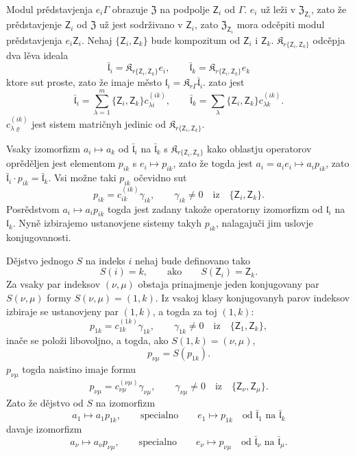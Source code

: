 \documentclass[11pt]{article}
\begin{document}
Modul prědstavjenja \(e_i\Gamma\) obrazuje \(\mathfrak Z\) na podpolje \(\mathsf{Z}_i\) od \(\Gamma\). \(e_i\) už leži v \(\mathfrak Z_{\mathsf{Z}_i}\), zato že prědstavjenje \(\mathsf{Z}_i\) od \(\mathfrak Z\) už jest sodrživano v \(\mathsf{Z}_i\), zato \(\mathfrak Z_{\mathsf{Z}_i}\) mora odcěpiti modul prědstavjenja \(e_i\mathsf{Z}_i\). Nehaj \(\{\mathsf{Z}_i,\mathsf{Z}_k\}\) bude kompozitum od \(\mathsf{Z}_i\) i \(\mathsf{Z}_k\). \(\mathfrak K_{r\{\mathsf{Z}_i,\mathsf{Z}_k\}}\) odcěpja dva lěva ideala
\[
\bar{\mathfrak l}_i=\mathfrak K_{r\{\mathsf{Z}_i,\mathsf{Z}_k\}}e_i,\qquad
\bar{\mathfrak l}_k=\mathfrak K_{r\{\mathsf{Z}_i,\mathsf{Z}_k\}}e_k
\]
ktore sut proste, zato že imaje město \(\mathfrak l_i=\mathfrak K_{r\Gamma}\bar{\mathfrak l}_i\). zato jest
\[
\bar{\mathfrak l}_i=\sum_{\lambda=1}^m\{\mathsf{Z}_i,\mathsf{Z}_k\}c_{\lambda i}^{(ik)},\qquad
\bar{\mathfrak l}_k=\sum_{\lambda}\{\mathsf{Z}_i,\mathsf{Z}_k\}c_{\lambda k}^{(ik)}.
\]
\(c_{\lambda\varrho}^{(ik)}\) jest sistem matričnyh jedinic od \(\mathfrak K_{r\{\mathsf{Z}_i,\mathsf{Z}_k\}}\).

Vsaky izomorfizm \(a_i\mapsto a_k\) od \(\bar{\mathfrak l}_i\) na \(\bar{\mathfrak l}_k\) s \(\mathfrak K_{r\{\mathsf{Z}_i,\mathsf{Z}_k\}}\) kako oblastju operatorov oprěděljen jest elementom \(p_{ik}\) s \(e_i\mapsto p_{ik}\), zato že togda jest \(a_i=a_ie_i\mapsto a_ip_{ik}\), zato \(\bar{\mathfrak l}_i\cdot p_{ik}=\bar{\mathfrak l}_k\). Vsi možne taki \(p_{ik}\) očevidno sut
\[
p_{ik}=c_{ik}^{(ik)}\gamma_{ik},\qquad \gamma_{ik}\ne0\quad\text{iz}\quad \{\mathsf{Z}_i,\mathsf{Z}_k\}.
\]
Posrědstvom \(a_i\mapsto a_ip_{ik}\) togda jest zadany takože operatorny izomorfizm od \(\mathfrak l_i\) na \(\mathfrak l_k\). Nyně izbirajemo ustanovjene sistemy takyh \(p_{ik}\), nalagajuči jim uslovje konjugovanosti.

Dějstvo jednogo \(S\) na indeks \(i\) nehaj bude definovano tako
\[
S(i)=k,\qquad\text{ako}\qquad S(\mathsf{Z}_i)=\mathsf{Z}_k.
\]
Za vsaky par indeksov \((\nu,\mu)\) obstaja prinajmenje jeden konjugovany par \(S(\nu,\mu)\) formy \(S(\nu,\mu)=(1,k)\). Iz vsakoj klasy konjugovanyh parov indeksov izbiraje se ustanovjeny par \((1,k)\), a togda za toj \((1,k)\):
\[
p_{1k}=c_{1k}^{(1k)}\gamma_{1k},\qquad \gamma_{1k}\ne0\quad\text{iz}\quad \{\mathsf{Z}_1,\mathsf{Z}_k\},
\]
inače se položi libovoljno, a togda, ako \(S(1,k)=(\nu,\mu)\),
\[
p_{\nu\mu}=S(p_{1k}).
\]
\(p_{\nu\mu}\) togda naistino imaje formu
\[
p_{\nu\mu}=c_{\nu\mu}^{(\nu\mu)}\gamma_{\nu\mu},\qquad
\gamma_{\nu\mu}\ne0\quad\text{iz}\quad \{\mathsf{Z}_\nu,\mathsf{Z}_\mu\}.
\]
Zato že dějstvo od \(S\) na izomorfizm
\[
a_1\mapsto a_1p_{1k},\qquad\text{specialno}\qquad e_1\mapsto p_{1k}
\quad\text{od }\bar{\mathfrak l}_1\text{ na }\bar{\mathfrak l}_k
\]
davaje izomorfizm
\[
a_\nu\mapsto a_\nu p_{\nu\mu},\qquad\text{specialno}\qquad e_\nu\mapsto p_{\nu\mu}
\quad\text{od }\bar{\mathfrak l}_\nu\text{ na }\bar{\mathfrak l}_\mu.
\]
\end{document}
